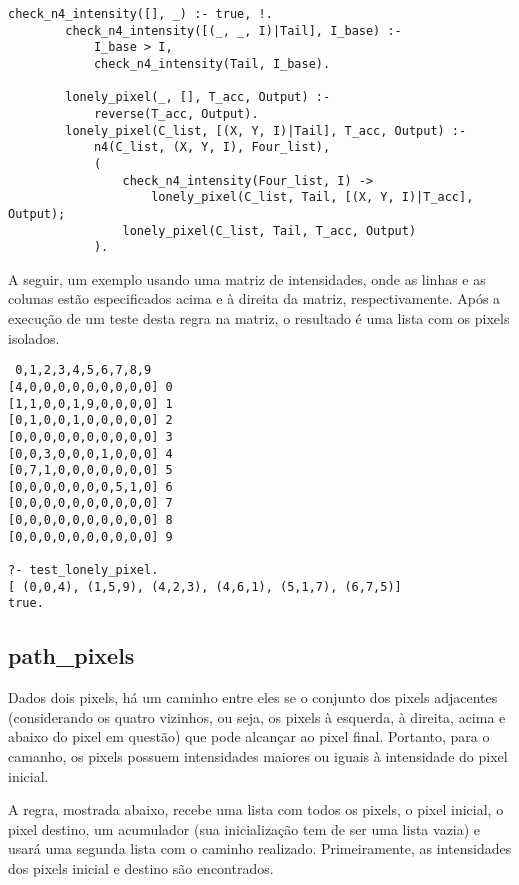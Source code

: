 \documentclass{article}
\begin{document}
        \begin{lstlisting}[frame=single]
        check_n4_intensity([], _) :- true, !.
        check_n4_intensity([(_, _, I)|Tail], I_base) :-
            I_base > I,
            check_n4_intensity(Tail, I_base).

        lonely_pixel(_, [], T_acc, Output) :-
            reverse(T_acc, Output).
        lonely_pixel(C_list, [(X, Y, I)|Tail], T_acc, Output) :-
            n4(C_list, (X, Y, I), Four_list),
            (
                check_n4_intensity(Four_list, I) ->
                    lonely_pixel(C_list, Tail, [(X, Y, I)|T_acc], Output);
                lonely_pixel(C_list, Tail, T_acc, Output)
            ).
        \end{lstlisting}

        A seguir, um exemplo usando uma matriz de intensidades, onde as linhas
        e as colunas estão especificados acima e à direita da matriz,
        respectivamente. Após a execução de um teste desta regra na matriz, o
        resultado é uma lista com os pixels isolados.

        \begin{verbatim}
 0,1,2,3,4,5,6,7,8,9
[4,0,0,0,0,0,0,0,0,0] 0
[1,1,0,0,1,9,0,0,0,0] 1
[0,1,0,0,1,0,0,0,0,0] 2
[0,0,0,0,0,0,0,0,0,0] 3
[0,0,3,0,0,0,1,0,0,0] 4
[0,7,1,0,0,0,0,0,0,0] 5
[0,0,0,0,0,0,0,5,1,0] 6
[0,0,0,0,0,0,0,0,0,0] 7
[0,0,0,0,0,0,0,0,0,0] 8
[0,0,0,0,0,0,0,0,0,0] 9

?- test_lonely_pixel.
[ (0,0,4), (1,5,9), (4,2,3), (4,6,1), (5,1,7), (6,7,5)]
true.

        \end{verbatim}

    \newpage
    \subsection*{path\_pixels}
        Dados dois pixels, há um caminho entre eles se o conjunto dos pixels
        adjacentes (considerando os quatro vizinhos, ou seja, os pixels à
        esquerda, à direita, acima e abaixo do pixel em questão) que pode
        alcançar ao pixel final. Portanto, para o camanho, os pixels possuem
        intensidades maiores ou iguais à intensidade do pixel inicial.
        
        A regra, mostrada abaixo, recebe uma lista com todos os pixels, o pixel
        inicial, o pixel destino, um acumulador (sua inicialização tem de ser
        uma lista vazia) e usará uma segunda lista com o caminho realizado.
        Primeiramente, as intensidades dos pixels inicial e destino são
        encontrados.
        
\end{document}
